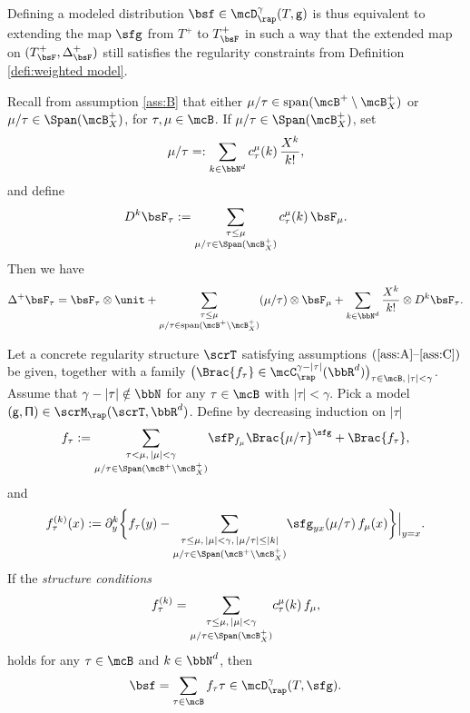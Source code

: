 Defining a modeled distribution $\bsf\in\mcD_\rap^\gamma(T,\sf g)$ is thus equivalent to extending the map $\sfg$ from $T^+$ to $T_{\bsF}^+$ in such a way that the extended map on $(T_{\bsF}^+,\Delta^+_{\bsF})$ still satisfies the regularity constraints from Definition \ref{defi:weighted model}.

Recall from assumption \eqref{ass:B} that either $\mu/\tau\in\textrm{span}(\mcB^+\setminus\mcB^+_X)$ or $\mu/\tau\in \Span (\mcB_X^+)$, for $\tau,\mu\in\mcB$.
If $\mu/\tau\in \Span (\mcB_X^+)$, set
\[
\mu/\tau =: \sum_{k\in\bbN^d} c_\tau^\mu(k)\,\frac{X^k}{k!},
\]
and define
\begin{align}\label{eq:k-antiderivative}
D^k\bsF_\tau := \sum_{\substack{\tau\leq \mu \\ \mu/\tau\in\Span (\mcB_X^+)}} c_\tau^\mu(k) \, \bsF_\mu.
\end{align}
Then we have
\begin{align*}
\Delta^+\bsF_\tau = \bsF_\tau\otimes\unit + \sum_{\substack{\tau\leq\mu \\ \mu/\tau\in\textrm{span}(\mcB^+\setminus\mcB^+_X)} }(\mu/\tau)\otimes \bsF_\mu + \sum_{k\in\bbN^d}\frac{X^k}{k!}\otimes D^k\bsF_\tau.
\end{align*}

\begin{thm} \label{thm:PD to MD}
Let a concrete regularity structure $\scrT$ satisfying assumptions $\textup{(\ref{ass:A}--\ref{ass:C})}$ be given, together with a family $\bigl(\Brac{f_\tau}\in\mcC_\rap^{\gamma-|\tau|}(\bbR^d)\bigr)_{\tau\in\mcB,\,\vert\tau\vert<\gamma}$. Assume that $\gamma-|\tau|\notin\bbN$ for any $\tau\in\mcB$ with $|\tau|<\gamma$. Pick a model ${\sf (g,\Pi)}\in\scrM_\rap(\scrT,\bbR^d)$. Define by decreasing induction on $\vert\tau\vert$
\begin{align*}
f_\tau := \underset{\mu/\tau\in\Span (\mcB^+\setminus\mcB^+_X)}{\sum_{\tau<\mu, \,|\mu|<\gamma}} \sfP_{f_\mu}\Brac{\mu/\tau}^\sfg + \Brac{f_\tau},
\end{align*}
and
\begin{align} \label{usual condition on MD}
f_{\tau}^{(k)}(x) := \partial_y^k\bigg\{f_\tau(y) -
\underset{\mu/\tau\in\Span (\mcB^+\setminus\mcB^+_X)}{\sum_{\tau\leq\mu, \,|\mu|<\gamma,\, |\mu/\tau|\le|k|}}
\sfg_{yx}(\mu/\tau)\,f_\mu(x)\bigg\}\Big|_{y=x}.
\end{align}
If the \emph{structure conditions}
\begin{align} \label{structure condition}
f_{\tau}^{(k)} = \underset{\mu/\tau\in\Span (\mcB_X^+)}{\sum_{\tau\leq\mu, \,|\mu|<\gamma}} c_\tau^\mu(k) \, f_\mu,
\end{align}
holds for any $\tau\in\mcB$ and $k\in\bbN^d$, then
\[
\bsf = \sum_{\tau\in\mcB}f_\tau\tau\in\mcD_\rap^{\gamma}(T, \sfg).
\]
\end{thm}

